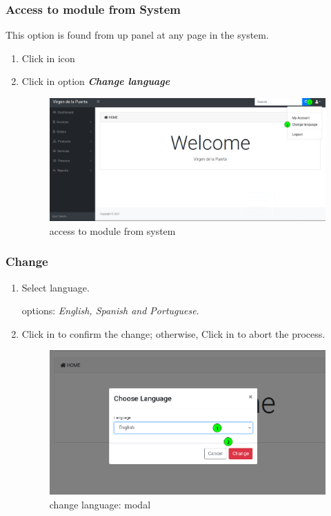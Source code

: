 \documentclass[a4paper,11pt]{refart}
\begin{document}
\subsubsection{Access to module from System}
This option is found from up panel at any page in the system.
\begin{enumerate}
	\item Click in icon 
	\item Click in option \textbf{\emph{Change language}}
	\begin{figure}[H]\centering
		\includegraphics[width=\textwidth]{images/change_language-system.png}
		\caption{access to module from system}
		\label{fig:change_language-system}
	\end{figure}
\end{enumerate}

\subsubsection{Change}
\begin{enumerate}
	\item Select language.
		\medskip
		\begin{leftbar}
			options: \emph{English, Spanish and Portuguese}.
		\end{leftbar}
	\item Click in  to confirm the change; otherwise, Click in  to abort the process.
	\begin{figure}[H]\centering
		\includegraphics[width=\textwidth]{images/change_language-modal.png}
		\caption{change language: modal}
		\label{change_language-modal}
	\end{figure}
\end{enumerate}





\end{document}
